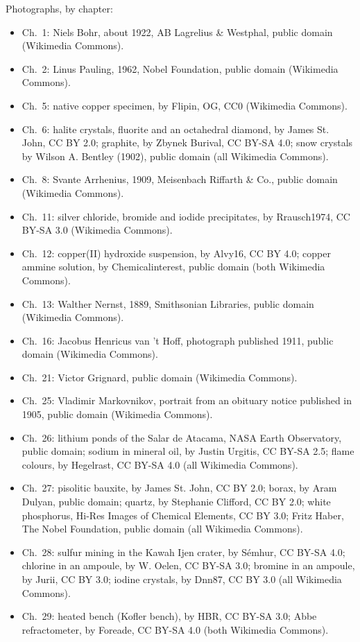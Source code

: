 \bigskip
\noindent Photographs, by chapter:
\begin{itemize}\small
  \item Ch.~1: Niels Bohr, about 1922, AB Lagrelius \& Westphal, public domain
        (Wikimedia Commons).
  \item Ch.~2: Linus Pauling, 1962, Nobel Foundation, public domain
        (Wikimedia Commons).
  \item Ch.~5: native copper specimen, by Flipin, OG, CC0 (Wikimedia
        Commons).
  \item Ch.~6: halite crystals, fluorite and an octahedral diamond, by
        James St. John, CC BY 2.0; graphite, by Zbynek Burival,
        CC BY-SA 4.0; snow crystals by Wilson A. Bentley (1902), public
        domain (all Wikimedia Commons).
  \item Ch.~8: Svante Arrhenius, 1909, Meisenbach Riffarth \& Co., public
        domain (Wikimedia Commons).
  \item Ch.~11: silver chloride, bromide and iodide precipitates, by
        Rrausch1974, CC BY-SA 3.0 (Wikimedia Commons).
  \item Ch.~12: copper(II) hydroxide suspension, by Alvy16, CC BY 4.0;
        copper ammine solution, by Chemicalinterest, public domain (both
        Wikimedia Commons).
  \item Ch.~13: Walther Nernst, 1889, Smithsonian Libraries, public domain
        (Wikimedia Commons).
  \item Ch.~16: Jacobus Henricus van 't Hoff, photograph published 1911,
        public domain (Wikimedia Commons).
  \item Ch.~21: Victor Grignard, public domain (Wikimedia Commons).
  \item Ch.~25: Vladimir Markovnikov, portrait from an obituary notice
        published in 1905, public domain (Wikimedia Commons).
  \item Ch.~26: lithium ponds of the Salar de Atacama, NASA Earth
        Observatory, public domain; sodium in mineral oil, by Justin Urgitis,
        CC BY-SA 2.5; flame colours, by Hegelrast, CC BY-SA 4.0 (all
        Wikimedia Commons).
  \item Ch.~27: pisolitic bauxite, by James St. John, CC BY 2.0; borax, by
        Aram Dulyan, public domain; quartz, by Stephanie Clifford, CC BY 2.0;
        white phosphorus, Hi-Res Images of Chemical Elements, CC BY 3.0;
        Fritz Haber, The Nobel Foundation, public domain (all Wikimedia
        Commons).
  \item Ch.~28: sulfur mining in the Kawah Ijen crater, by S\'emhur,
        CC BY-SA 4.0; chlorine in an ampoule, by W. Oelen, CC BY-SA 3.0;
        bromine in an ampoule, by Jurii, CC BY 3.0; iodine crystals, by
        Dnn87, CC BY 3.0 (all Wikimedia Commons).
  \item Ch.~29: heated bench (Kofler bench), by HBR, CC BY-SA 3.0; Abbe
        refractometer, by Foreade, CC BY-SA 4.0 (both Wikimedia Commons).
\end{itemize}
\clearpage
